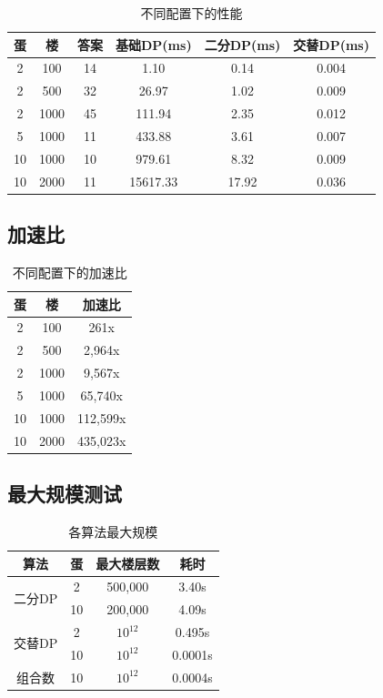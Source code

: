 \documentclass[12pt,a4paper]{article}
\begin{document}
\begin{table}[H]
\centering
\caption{不同配置下的性能}
\begin{tabular}{@{}cccccc@{}}
\toprule
\textbf{蛋} & \textbf{楼} & \textbf{答案} & \textbf{基础DP(ms)} & \textbf{二分DP(ms)} & \textbf{交替DP(ms)} \\
\midrule
2 & 100 & 14 & 1.10 & 0.14 & 0.004 \\
2 & 500 & 32 & 26.97 & 1.02 & 0.009 \\
2 & 1000 & 45 & 111.94 & 2.35 & 0.012 \\
5 & 1000 & 11 & 433.88 & 3.61 & 0.007 \\
10 & 1000 & 10 & 979.61 & 8.32 & 0.009 \\
10 & 2000 & 11 & 15617.33 & 17.92 & 0.036 \\
\bottomrule
\end{tabular}
\end{table}

\subsection*{加速比}

\begin{table}[H]
\centering
\caption{不同配置下的加速比}
\begin{tabular}{@{}ccc@{}}
\toprule
\textbf{蛋} & \textbf{楼} & \textbf{加速比} \\
\midrule
2 & 100 & 261x \\
2 & 500 & 2,964x \\
2 & 1000 & 9,567x \\
5 & 1000 & 65,740x \\
10 & 1000 & 112,599x \\
10 & 2000 & 435,023x \\
\bottomrule
\end{tabular}
\end{table}

\subsection*{最大规模测试}

\begin{table}[H]
\centering
\caption{各算法最大规模}
\begin{tabular}{@{}cccc@{}}
\toprule
\textbf{算法} & \textbf{蛋} & \textbf{最大楼层数} & \textbf{耗时} \\
\midrule
\multirow{2}{*}{二分DP} & 2 & 500,000 & 3.40s \\
& 10 & 200,000 & 4.09s \\
\midrule
\multirow{2}{*}{交替DP} & 2 & $10^{12}$ & 0.495s \\
& 10 & $10^{12}$ & 0.0001s \\
\midrule
组合数 & 10 & $10^{12}$ & 0.0004s \\
\bottomrule
\end{tabular}
\end{table}
\end{document}
